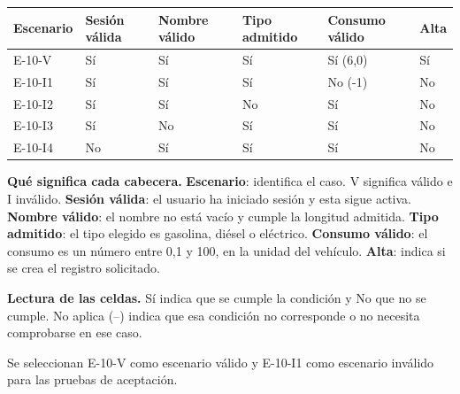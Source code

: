 \begingroup\fontsize{7.8}{11}\selectfont\setlength{\tabcolsep}{3pt}
\begin{tabularx}{\linewidth}{@{}*{6}{Y}@{}}\toprule
\textbf{Escenario} & \textbf{Sesión válida} & \textbf{Nombre válido} & \textbf{Tipo admitido} & \textbf{Consumo válido} & \textbf{Alta}\\\midrule
E-10-V & Sí & Sí & Sí & Sí (6,0) & Sí\\[3pt]
E-10-I1 & Sí & Sí & Sí & No (-1) & No\\[3pt]
E-10-I2 & Sí & Sí & No & Sí & No\\[3pt]
E-10-I3 & Sí & No & Sí & Sí & No\\[3pt]
E-10-I4 & No & Sí & Sí & Sí & No\\[3pt]
\bottomrule\end{tabularx}\endgroup\par
{\fontsize{9}{11}\selectfont\textbf{Qué significa cada cabecera.} \textbf{Escenario}: identifica el caso. V significa válido e I inválido. \textbf{Sesión válida}: el usuario ha iniciado sesión y esta sigue activa. \textbf{Nombre válido}: el nombre no está vacío y cumple la longitud admitida. \textbf{Tipo admitido}: el tipo elegido es gasolina, diésel o eléctrico. \textbf{Consumo válido}: el consumo es un número entre 0,1 y 100, en la unidad del vehículo. \textbf{Alta}: indica si se crea el registro solicitado.\par\textbf{Lectura de las celdas.} Sí indica que se cumple la condición y No que no se cumple. No aplica (--) indica que esa condición no corresponde o no necesita comprobarse en ese caso.\par}


Se seleccionan E-10-V como escenario válido y E-10-I1 como escenario inválido para las pruebas de aceptación.\par


